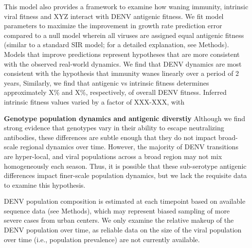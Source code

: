 \documentclass[11pt,oneside,letterpaper]{article}
\def\tbc#1{\textcolor{purple}{[#1]}}
\begin{document}
This model also provides a framework to examine how waning immunity, intrinsic viral fitness and XYZ interact with DENV antigenic fitness.
We fit model parameters to maximize the improvement in growth rate prediction error compared to a null model wherein all viruses are assigned equal antigenic fitness (similar to a standard SIR model; for a detailed explanation, see Methods).
Models that improve predictions represent hypotheses that are more consistent with the observed real-world dynamics.
We find that DENV dynamics are most consistent with the hypothesis that immunity wanes linearly over a period of 2 years, %
Similarly, we find that antigenic vs intrinsic fitness determines approximately X\% and X\%, respectively, of overall DENV fitness.
Inferred intrinsic fitness values varied by a factor of XXX-XXX, with %



\textbf{Genotype population dynamics and antigenic diverstiy}
Although we find strong evidence that genotypes vary in their ability to escape neutralizing antibodies, these differences are subtle enough that they do not impact broad-scale regional dynamics over time.
However, the majority of DENV transitions are hyper-local, and viral populations across a broad region may not mix homogeneously each season.
Thus, it is possible that these sub-serotype antigenic differences impact finer-scale population dynamics, but we lack the requisite data to examine this hypothesis.


DENV population composition is estimated at each timepoint based on available sequence data (see Methods), which may represent biased sampling of more severe cases from urban centers.
We only examine the relative makeup of the DENV population over time, as reliable data on the size of the viral population over time (i.e., population prevalence) are not currently available.

\end{document}
